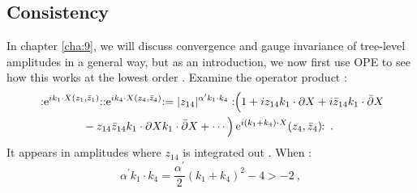 \subsection*{Consistency}
In chapter \ref{cha:9}, we will discuss convergence and gauge invariance of tree-level amplitudes in a general way, but as an introduction, we now first use OPE to see how this works at the lowest order . Examine the operator product :
\begin{align}
	&: \mathrel{\mathrm{e}^{i k_{1} \cdot X(z_{1}, \bar{z}_{1})}}: 
	: \mathrel{\mathrm{e}^{i k_{4} \cdot X(z_{4}, \bar{z}_{4})}}: = 
	|z_{14}|^{\alpha^{\prime} k_{1} \cdot k_{4}}:\!\!
	\Bigl(1+ i z_{14} k_{1} \cdot \partial X + i \bar{z}_{14} k_{1} \cdot \bar{\partial} X \nonumber \\
	&\qquad \qquad -z_{14} \bar{z}_{14} k_{1} \cdot \partial X k_{1} \cdot \bar{\partial} X+\cdots \Bigr) 
	\,\mathrm{e}^{i(k_{1}+k_{4}) \cdot X}(z_{4}, \bar{z}_{4})\!\!: \:. \label{6.6.24}
\end{align}
It appears in amplitudes where $z_{14}$ is integrated out . When :
\begin{equation}
	\alpha^{\prime} k_{1} \cdot k_{4}=\frac{\alpha^{\prime}}{2}(k_{1}+k_{4})^{2}-4>-2 \:, \label{6.6.25}
\end{equation}
